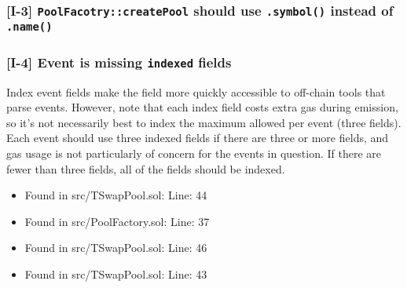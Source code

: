 \begin{Shaded}
\begin{Highlighting}[]
\VariableTok{+        \}}
\NormalTok{    \}}
\end{Highlighting}
\end{Shaded}

\subsubsection{\texorpdfstring{{[}I-3{]}
\texttt{PoolFacotry::createPool} should use \texttt{.symbol()} instead
of
\texttt{.name()}}{{[}I-3{]} PoolFacotry::createPool should use .symbol() instead of .name()}}\label{i-3-poolfacotrycreatepool-should-use-.symbol-instead-of-.name}

\begin{Shaded}
\begin{Highlighting}[]
\end{Highlighting}
\end{Shaded}

\subsubsection{\texorpdfstring{{[}I-4{]} Event is missing
\texttt{indexed}
fields}{{[}I-4{]} Event is missing indexed fields}}\label{i-4-event-is-missing-indexed-fields}

Index event fields make the field more quickly accessible to off-chain
tools that parse events. However, note that each index field costs extra
gas during emission, so it's not necessarily best to index the maximum
allowed per event (three fields). Each event should use three indexed
fields if there are three or more fields, and gas usage is not
particularly of concern for the events in question. If there are fewer
than three fields, all of the fields should be indexed.

\begin{itemize}
\tightlist
\item
  Found in src/TSwapPool.sol: Line: 44
\item
  Found in src/PoolFactory.sol: Line: 37
\item
  Found in src/TSwapPool.sol: Line: 46
\item
  Found in src/TSwapPool.sol: Line: 43
\end{itemize}
